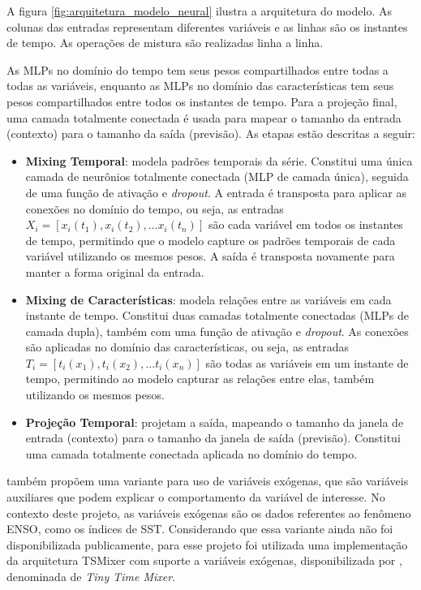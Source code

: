A figura \ref{fig:arquitetura_modelo_neural} ilustra a arquitetura do modelo. As colunas das entradas representam diferentes
variáveis e as linhas são os instantes de tempo. As operações de mistura são realizadas linha a linha. 

As MLPs no domínio do tempo tem seus pesos compartilhados entre todas a todas as variáveis, enquanto as MLPs no domínio das 
características tem seus pesos compartilhados entre todos os instantes de tempo. Para a projeção final, uma camada totalmente 
conectada é usada para mapear o tamanho da entrada (contexto) para o tamanho da saída (previsão). As etapas estão descritas a seguir:

\begin{itemize}
	\item \textbf{Mixing Temporal}: modela padrões temporais da série. Constitui uma única camada de neurônios totalmente
conectada (MLP de camada única), seguida de uma função de ativação e \textit{dropout}. A entrada é transposta para aplicar 
as conexões no domínio do tempo, ou seja, as entradas $ X_i = [x_i(t_1), x_i(t_2), \dots x_i(t_n)] $ são cada variável em todos 
os instantes de tempo, permitindo que o modelo capture os padrões temporais de cada variável utilizando os mesmos pesos.
A saída é transposta novamente para manter a forma original da entrada.

	\item \textbf{Mixing de Características}: modela relações entre as variáveis em cada instante de tempo. Constitui
duas camadas totalmente conectadas (MLPs de camada dupla), também com uma função de ativação e \textit{dropout}. As conexões
são aplicadas no domínio das características, ou seja, as entradas $ T_i = [t_i(x_1), t_i(x_2), \dots t_i(x_n)] $ são
todas as variáveis em um instante de tempo, permitindo ao modelo capturar as relações entre elas, também utilizando os
mesmos pesos.

	\item \textbf{Projeção Temporal}: projetam a saída, mapeando o tamanho da janela de entrada (contexto) para o tamanho 
da janela de saída (previsão). Constitui uma camada totalmente conectada aplicada no domínio do tempo.
\end{itemize}

 também propõem uma variante para uso de variáveis exógenas, que são variáveis auxiliares que podem
explicar o comportamento da variável de interesse. No contexto deste projeto, as variáveis exógenas são os dados referentes
ao fenômeno ENSO, como os índices de SST. Considerando que essa variante ainda não foi disponibilizada publicamente,
para esse projeto foi utilizada uma implementação da arquitetura TSMixer com suporte a variáveis exógenas,
disponibilizada por , denominada de \textit{Tiny Time Mixer}.